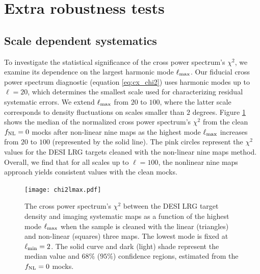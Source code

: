 \section{Extra robustness tests}

\subsection{Scale dependent systematics}\label{sec:scalesys}
To investigate the statistical significance of the cross power spectrum's $\chi^{2}$, we examine its dependence on the largest harmonic mode $\ell_{\rm max}$. Our fiducial cross power spectrum diagnostic (equation \ref{eq:cx_chi2}) uses harmonic modes up to $\ell=20$, which determines the smallest scale used for characterizing residual systematic errors. We extend $\ell_{\rm max}$ from $20$ to $100$, where the latter scale corresponds to density fluctuations on scales smaller than $2$ degrees. Figure \ref{fig:chi2cellextend} shows the median of the normalized cross power spectrum's $\chi^{2}$ from the clean $f_{\rm NL}=0$ mocks after non-linear nine maps as the highest mode $\ell_{\rm max}$ increases from $20$ to $100$ (represented by the solid line). The pink circles represent the $\chi^{2}$ values for the DESI LRG targets cleaned with the non-linear nine maps method. Overall, we find that for all scales up to $\ell=100$, the nonlinear nine maps approach yields consistent values with the clean mocks.

\begin{figure}
\centering
\texttt{[image: chi2lmax.pdf]}
\caption{The cross power spectrum's $\chi^{2}$ between the DESI LRG target density and imaging systematic maps as a function of the highest mode $\ell_{\rm max}$ when the sample is cleaned with the linear (triangles) and non-linear (squares) three maps. The lowest mode is fixed at $\ell_{\rm min}=2$. The solid curve and dark (light) shade represent the median value and $68\%$ ($95\%$) confidence regions, estimated from the $f_{\rm NL}=0$ mocks.}\label{fig:chi2cellextend}
\end{figure}



